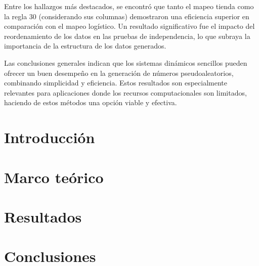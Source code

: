 \documentclass[letterpaper,spanish,12pt]{book}
\begin{document}
Entre los hallazgos más destacados, se encontró que tanto el mapeo tienda como la regla 30 (considerando sus columnas) demostraron una eficiencia superior en comparación con el mapeo logístico. Un resultado significativo fue el impacto del reordenamiento de los datos en las pruebas de independencia, lo que subraya la importancia de la estructura de los datos generados.

Las conclusiones generales indican que los sistemas dinámicos sencillos pueden ofrecer un buen desempeño en la generación de números pseudoaleatorios, combinando simplicidad y eficiencia. Estos resultados son especialmente relevantes para aplicaciones donde los recursos computacionales son limitados, haciendo de estos métodos una opción viable y efectiva.



\tableofcontents %
\mainmatter 
\chapter{Introducción}


\chapter{Marco teórico}


\chapter{Resultados}


% 

\chapter{Conclusiones}



% 
\end{document}
